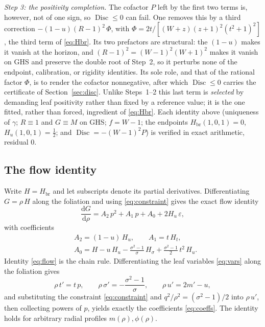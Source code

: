 \documentclass[11pt]{article}
\theoremstyle{plain}
\theoremstyle{definition}
\newcommand{\dd}{\mathrm{d}}
\newcommand{\Hbr}{H_{\mathrm{br}}}
\newcommand{\Disc}{\operatorname{Disc}}
\newcommand{\eps}{\varepsilon}
\begin{document}
\emph{Step 3: the positivity completion.} The cofactor $P$ left by the first two terms is, however, not of
one sign, so $\Disc\le0$ can fail. One removes this by a third correction $-(1-u)(R-1)^2\,\Phi$, with
$\Phi=2t/[(W+z)(z+1)^2(t^2+1)^2]$, the third term of \eqref{eq:Hbr}. Its two prefactors are structural: the
$(1-u)$ makes it vanish at the horizon, and $(R-1)^2=(W-1)^2(W+1)^2$ makes it vanish on GHS and preserve the
double root of Step~2, so it perturbs none of the endpoint, calibration, or rigidity identities. Its sole
role, and that of the rational factor $\Phi$, is to render the cofactor nonnegative, after which $\Disc\le0$
carries the certificate of Section~\ref{sec:disc}. Unlike Steps~1--2 this last term is \emph{selected} by
demanding leaf positivity rather than fixed by a reference value; it is the one fitted, rather than forced,
ingredient of \eqref{eq:Hbr}. Each identity above (uniqueness of $\gamma$; $R\equiv1$ and $G\equiv M$ on GHS;
$f=W-1$; the endpoints $\Hbr(1,0,1)=0$, $H_u(1,0,1)=\tfrac12$; and $\Disc=-(W-1)^2P$) is verified in exact
arithmetic, residual $0$.

\subsection{The flow identity}\label{sec:flow}

Write $H=\Hbr$ and let subscripts denote its partial derivatives. Differentiating $G=\rho\,H$ along the
foliation and using \eqref{eq:constraint} gives the exact flow identity
\begin{equation}\label{eq:flow}
  \frac{\dd G}{\dd\rho}=A_2\,p^2+A_1\,p+A_0+2H_u\,\eps,
\end{equation}
with coefficients
\begin{equation}\label{eq:coeffs}
\begin{aligned}
  &A_2=(1-u)\,H_u,\qquad A_1=t\,H_t,\\
  &A_0=H-u\,H_u-\frac{\sigma^2-1}{\sigma}\,H_\sigma+\frac{\sigma^2-1}{2}\,t^2\,H_u .
\end{aligned}
\end{equation}
Identity \eqref{eq:flow} is the chain rule. Differentiating the leaf variables \eqref{eq:vars} along the
foliation gives
\[
  \rho\,t'=t\,p,\qquad \rho\,\sigma'=-\frac{\sigma^2-1}{\sigma},\qquad \rho\,u'=2m'-u,
\]
and substituting the constraint \eqref{eq:constraint} and $q^2/\rho^2=(\sigma^2-1)/2$ into $\rho\,u'$, then
collecting powers of $p$, yields exactly the coefficients \eqref{eq:coeffs}. The identity holds for arbitrary
radial profiles $m(\rho),\phi(\rho)$.
\end{document}
